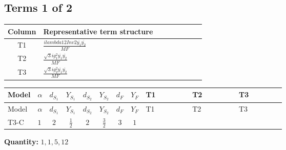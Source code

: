 \documentclass[8pt]{article}
\begin{document}
\begin{landscape}
\subsection*{Terms 1 of 2}
\begin{center}
\begin{tabular}{@{}c >{\raggedright\arraybackslash}p{0.82\linewidth}@{}}
\toprule
Column & Representative term structure \\
\midrule
T1 & \(\displaystyle \frac{i lambda12Inv2 \overline{y_{1}} \overline{y_{2}}}{MF}\) \\
\midrule
T2 & \(\displaystyle \frac{\sqrt{3} i g_{1}^{2} \overline{y_{1}} \overline{y_{2}}}{MF}\) \\
\midrule
T3 & \(\displaystyle \frac{\sqrt{3} i g_{2}^{2} \overline{y_{1}} \overline{y_{2}}}{MF}\) \\
\midrule
\bottomrule
\end{tabular}
\end{center}
\smallskip
\tiny
\begin{longtable}{@{}llcccccc >{\raggedright\arraybackslash}p{0.21\linewidth} >{\raggedright\arraybackslash}p{0.21\linewidth} >{\raggedright\arraybackslash}p{0.21\linewidth}@{}}
\toprule
Model & $\alpha$ & $d_{S_1}$ & $Y_{S_1}$ & $d_{S_2}$ & $Y_{S_2}$ & $d_F$ & $Y_F$ & T1 & T2 & T3 \\
\midrule
\endfirsthead
\toprule
Model & $\alpha$ & $d_{S_1}$ & $Y_{S_1}$ & $d_{S_2}$ & $Y_{S_2}$ & $d_F$ & $Y_F$ & T1 & T2 & T3 \\
\midrule
\endhead
T3-C & $1$ & $2$ & $\frac{1}{2}$ & $2$ & $\frac{3}{2}$ & $3$ & $1$ & \scriptsize\adjustbox{max width=\linewidth}{$\begin{gathered} \frac{i lambda12Inv2 \overline{y_{1}} \overline{y_{2}}}{3 MF}\end{gathered}$} & \scriptsize\adjustbox{max width=\linewidth}{$\begin{gathered} \frac{\sqrt{3} i g_{1}^{2} \overline{y_{1}} \overline{y_{2}}}{2 MF}\end{gathered}$} & \scriptsize\adjustbox{max width=\linewidth}{$\begin{gathered} \frac{\sqrt{3} i g_{2}^{2} \overline{y_{1}} \overline{y_{2}}}{4 MF}\end{gathered}$} \\
\midrule
\bottomrule
\end{longtable}
\clearpage
\noindent\textbf{Quantity: }$\mathrm{1,1,5,12}$\par\smallskip

\end{landscape}
\end{document}
